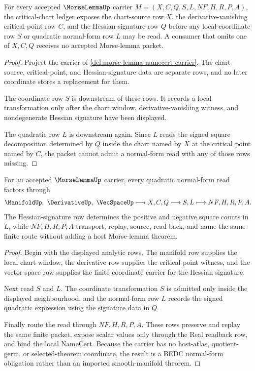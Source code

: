 \begin{theorem}
\label{thm:morse-lemma-critical-chart-ledger}
For every accepted $\MorseLemmaUp$ carrier $M=(X,C,Q,S,L,NF,H,R,P,A)$, the critical-chart ledger exposes the chart-source row $X$, the derivative-vanishing critical-point row $C$, and the Hessian-signature row $Q$ before any local-coordinate row $S$ or quadratic normal-form row $L$ may be read. A consumer that omits one of $X,C,Q$ receives no accepted Morse-lemma packet.
\end{theorem}
\begin{proof}
Project the carrier of \autoref{def:morse-lemma-namecert-carrier}. The chart-source, critical-point, and Hessian-signature data are separate rows, and no later coordinate stores a replacement for them.

The coordinate row $S$ is downstream of these rows. It records a local transformation only after the chart window, derivative-vanishing witness, and nondegenerate Hessian signature have been displayed.

The quadratic row $L$ is downstream again. Since $L$ reads the signed square decomposition determined by $Q$ inside the chart named by $X$ at the critical point named by $C$, the packet cannot admit a normal-form read with any of those rows missing.
\end{proof}

\begin{theorem}
\label{thm:morse-lemma-hessian-normal-form-obligation}
For an accepted $\MorseLemmaUp$ carrier, every quadratic normal-form read factors through
$$
\ManifoldUp,\ \DerivativeUp,\ \VecSpaceUp
\longmapsto
X,C,Q
\longmapsto
S,L
\longmapsto
NF,H,R,P,A .
$$
The Hessian-signature row determines the positive and negative square counts in $L$, while $NF,H,R,P,A$ transport, replay, source, read back, and name the same finite route without adding a host Morse-lemma theorem.
\end{theorem}
\begin{proof}
Begin with the displayed analytic rows. The manifold row supplies the local chart window, the derivative row supplies the critical-point witness, and the vector-space row supplies the finite coordinate carrier for the Hessian signature.

Next read $S$ and $L$. The coordinate transformation $S$ is admitted only inside the displayed neighbourhood, and the normal-form row $L$ records the signed quadratic expression using the signature data in $Q$.

Finally route the read through $NF,H,R,P,A$. These rows preserve and replay the same finite packet, expose scalar values only through the Real readback row, and bind the local NameCert. Because the carrier has no host-atlas, quotient-germ, or selected-theorem coordinate, the result is a BEDC normal-form obligation rather than an imported smooth-manifold theorem.
\end{proof}

